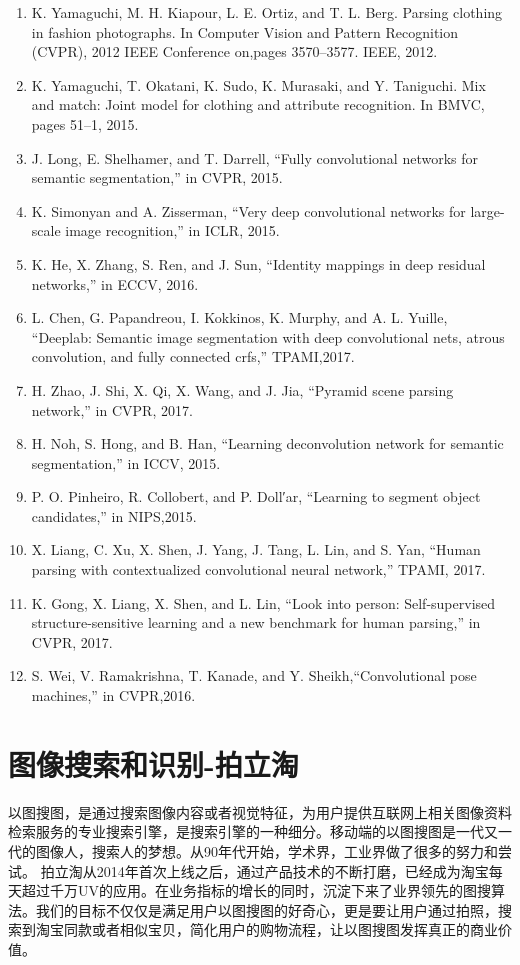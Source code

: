 \begin{enumerate}
\item K. Yamaguchi, M. H. Kiapour, L. E. Ortiz, and T. L. Berg. Parsing clothing in fashion photographs. In Computer Vision and Pattern Recognition (CVPR), 2012 IEEE Conference on,pages 3570–3577. IEEE, 2012. 
\item K. Yamaguchi, T. Okatani, K. Sudo, K. Murasaki, and Y. Taniguchi. Mix and match: Joint model for clothing and attribute recognition. In BMVC, pages 51–1, 2015.
\item J. Long, E. Shelhamer, and T. Darrell, “Fully convolutional networks for semantic segmentation,” in CVPR, 2015.
\item K. Simonyan and A. Zisserman, “Very deep convolutional networks for large-scale image recognition,” in ICLR, 2015.
\item K. He, X. Zhang, S. Ren, and J. Sun, “Identity mappings in deep residual networks,” in ECCV, 2016.
\item L. Chen, G. Papandreou, I. Kokkinos, K. Murphy, and A. L. Yuille, “Deeplab: Semantic image segmentation with deep convolutional nets, atrous convolution, and fully connected crfs,” TPAMI,2017.
\item H. Zhao, J. Shi, X. Qi, X. Wang, and J. Jia, “Pyramid scene parsing network,” in CVPR, 2017.
\item H. Noh, S. Hong, and B. Han, “Learning deconvolution network for semantic segmentation,” in ICCV, 2015.
\item P. O. Pinheiro, R. Collobert, and P. Doll′ar, “Learning to segment object candidates,” in NIPS,2015.
\item X. Liang, C. Xu, X. Shen, J. Yang, J. Tang, L. Lin, and S. Yan, “Human parsing with contextualized convolutional neural network,” TPAMI, 2017.
\item K. Gong, X. Liang, X. Shen, and L. Lin, “Look into person: Self-supervised structure-sensitive learning and a new benchmark for human parsing,” in CVPR, 2017.
\item S. Wei, V. Ramakrishna, T. Kanade, and Y. Sheikh,“Convolutional pose machines,” in CVPR,2016.
\end{enumerate}


\section{图像搜索和识别-拍立淘}

以图搜图，是通过搜索图像内容或者视觉特征，为用户提供互联网上相关图像资料检索服务的专业搜索引擎，是搜索引擎的一种细分。移动端的以图搜图是一代又一代的图像人，搜索人的梦想。从90年代开始，学术界，工业界做了很多的努力和尝试。 拍立淘从2014年首次上线之后，通过产品技术的不断打磨，已经成为淘宝每天超过千万UV的应用。在业务指标的增长的同时，沉淀下来了业界领先的图搜算法。我们的目标不仅仅是满足用户以图搜图的好奇心，更是要让用户通过拍照，搜索到淘宝同款或者相似宝贝，简化用户的购物流程，让以图搜图发挥真正的商业价值。

